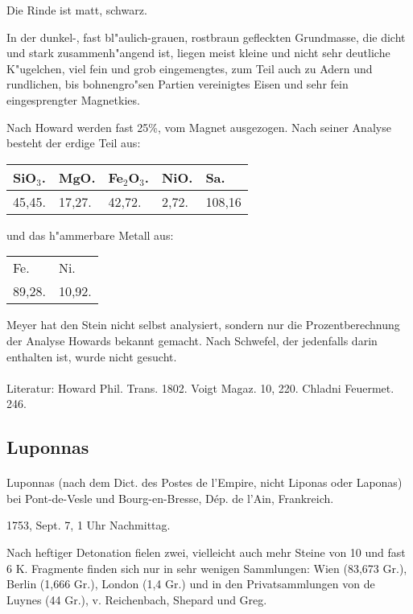 \documentclass[a4paper, 11pt, oneside]{article}
\begin{document}
Die Rinde ist matt, schwarz.

In der dunkel-, fast bl"aulich-grauen, rostbraun gefleckten Grundmasse, die dicht und stark zusammenh"angend ist, liegen meist kleine und nicht sehr deutliche K"ugelchen, viel fein und grob eingemengtes, zum Teil auch zu Adern und rundlichen, bis bohnengro"sen Partien vereinigtes Eisen und sehr fein eingesprengter Magnetkies.

Nach Howard werden fast 25\%, vom Magnet ausgezogen. Nach seiner Analyse besteht der erdige Teil aus:
\begin{table}[!ht]
    \centering
    \begin{tabular}{l l l l l}
        SiO$_{3}$. & MgO. & Fe$_{2}$O$_{3}$. & NiO. & Sa.\\\hline
        45,45. & 17,27. & 42,72. & 2,72. & 108,16
    \end{tabular}
\end{table}

und das h"ammerbare Metall aus:
\begin{table}[!ht]
    \centering
    \begin{tabular}{l l}
        Fe. & Ni.\\
        89,28. & 10,92.
    \end{tabular}
\end{table}

Meyer hat den Stein nicht selbst analysiert, sondern nur die Prozentberechnung der Analyse Howards bekannt gemacht. Nach Schwefel, der jedenfalls darin enthalten ist, wurde nicht gesucht.
\footnotesize
\paragraph{}
Literatur: Howard Phil. Trans. 1802. Voigt Magaz. 10, 220. Chladni Feuermet. 246.
\subsection{Luponnas}
\normalsize
\paragraph{}
Luponnas (nach dem Dict. des Postes de l'Empire, nicht Liponas oder Laponas) bei Pont-de-Vesle und Bourg-en-Bresse, Dép. de l'Ain, Frankreich.

1753, Sept. 7, 1 Uhr Nachmittag.

Nach heftiger Detonation fielen zwei, vielleicht auch mehr Steine von 10 und fast 6 K. Fragmente finden sich nur in sehr wenigen Sammlungen: Wien (83,673 Gr.), Berlin (1,666 Gr.), London (1,4 Gr.) und in den Privatsammlungen von de Luynes (44 Gr.), v. Reichenbach, Shepard und Greg.
\end{document}

